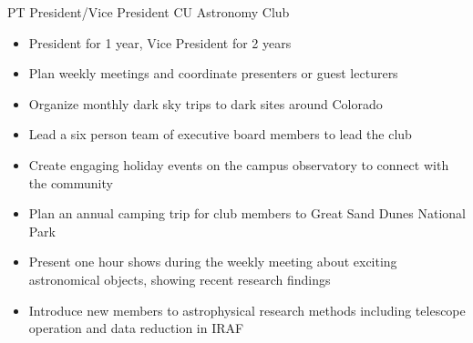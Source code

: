     {PT} %
    {President/Vice President} %
    {CU Astronomy Club} %
    {}
    {\begin{itemize}
    \setlength\itemsep{0.1em}
        \item President for 1 year, Vice President for 2 years
        \item Plan weekly meetings and coordinate presenters or guest lecturers
        \item Organize monthly dark sky trips to dark sites around Colorado
        \item Lead a six person team of executive board members to lead the club
        \item Create engaging holiday events on the campus observatory to connect with the community
        \item Plan an annual camping trip for club members to Great Sand Dunes National Park
        \item Present one hour shows during the weekly meeting about exciting astronomical objects, showing recent research findings
        \item Introduce new members to astrophysical research methods including telescope operation and data reduction in IRAF
    \end{itemize}
}